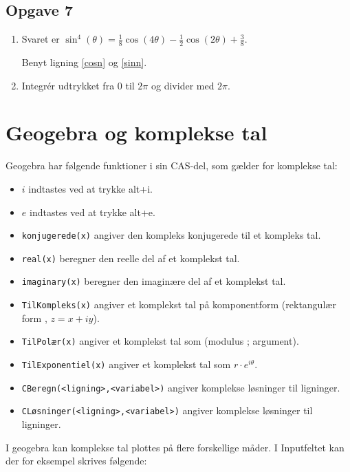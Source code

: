 \documentclass[a4paper, 12pt,titlepage]{article}
\begin{document}
\subsection*{Opgave 7}
\label{sec:org678b93e}
\begin{enumerate}
\item Svaret er \(\sin^4(\theta) = \frac{1}{8} \cos(4 \theta) -\frac{1}{2} \cos(2 \theta) + \frac{3}{8}\).

Benyt ligning \eqref{cosn} og \eqref{sinn}.

\item Integrér udtrykket fra 0 til \(2\pi\) og divider med \(2 \pi\).
\end{enumerate}


\newpage
\section{Geogebra og komplekse tal}
\label{sec:org1fa965a}

Geogebra har følgende funktioner i sin CAS-del, som gælder for komplekse tal:

\begin{itemize}
\item \(i\) indtastes ved at trykke alt+i.
\item \(e\) indtastes ved at trykke alt+e.
\item \texttt{konjugerede(x)} angiver den kompleks konjugerede til et kompleks tal.
\item \texttt{real(x)} beregner den reelle del af et komplekst tal.
\item \texttt{imaginary(x)} beregner den imaginære del af et komplekst tal.
\item \texttt{TilKompleks(x)} angiver et komplekst tal på komponentform (rektangulær form , \(z=x+iy\)).
\item \texttt{TilPolær(x)} angiver et komplekst tal som (modulus ; argument).
\item \texttt{TilExponentiel(x)} angiver et komplekst tal som \(r \cdot e^{i\theta}\).
\item \texttt{CBeregn(<ligning>,<variabel>)} angiver komplekse løsninger til ligninger.
\item \texttt{CLøsninger(<ligning>,<variabel>)} angiver komplekse løsninger til ligninger.
\end{itemize}

I geogebra kan komplekse tal plottes på flere forskellige måder. I Inputfeltet kan der for eksempel skrives følgende:
\end{document}
